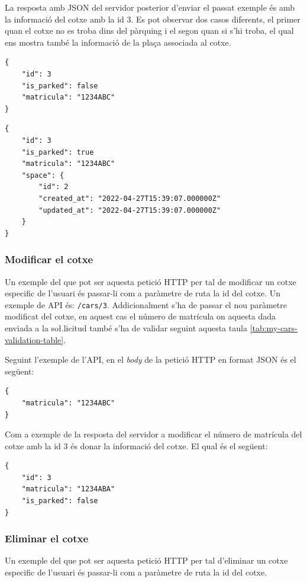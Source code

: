 La resposta amb JSON del servidor posterior d'enviar el passat exemple és amb la informació del cotxe
amb la id 3. Es pot observar dos casos diferents, el primer quan el cotxe no es troba dins del pàrquing
i el segon quan si s'hi troba, el qual ens mostra també la informació de la plaça associada al cotxe.
\begin{verbatim}
{
    "id": 3
    "is_parked": false
    "matricula": "1234ABC"
}
\end{verbatim}

\begin{verbatim}
{
    "id": 3
    "is_parked": true
    "matricula": "1234ABC"
    "space": {
        "id": 2
        "created_at": "2022-04-27T15:39:07.000000Z"
        "updated_at": "2022-04-27T15:39:07.000000Z"
    }
}
\end{verbatim}
\subsubsection{Modificar el cotxe}
\label{sssec:modificar_cotxe}

Un exemple del que pot ser aquesta petició HTTP per tal de modificar un cotxe especific de l'usuari
és passar-li com a paràmetre de ruta la id del cotxe. Un exemple de API és: \texttt{/cars/3}.
Addicionalment s'ha de passar el nou paràmetre modificat del cotxe, en aquest cas el número de
matrícula on aquesta dada enviada a la so\l.licitud també s'ha de validar seguint aquesta taula \autoref{tab:my-cars-validation-table}.

Seguint l'exemple de l'API, en el \emph{body} de la petició HTTP en format JSON és el següent:
\begin{verbatim}
{
    "matricula": "1234ABC"
}
\end{verbatim}

Com a exemple de la resposta del servidor a modificar el número de matrícula del cotxe amb la id 3
és donar la informació del cotxe. El qual és el següent:
\begin{verbatim}
{
    "id": 3
    "matricula": "1234ABA"
    "is_parked": false
}
\end{verbatim}

\subsubsection{Eliminar el cotxe}
\label{sssec:eliminar_cotxe}

Un exemple del que pot ser aquesta petició HTTP per tal d'eliminar un cotxe especific de l'usuari
és passar-li com a paràmetre de ruta la id del cotxe.

